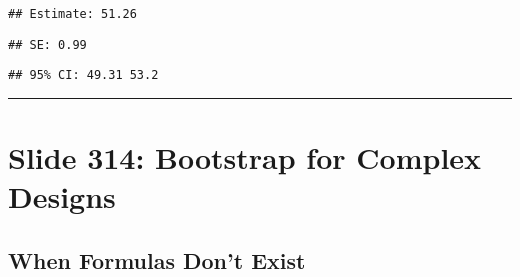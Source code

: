 \documentclass[
]{article}
\newenvironment{Shaded}{\begin{snugshade}}{\end{snugshade}}
\newcommand{\DecValTok}[1]{\textcolor[rgb]{0.00,0.00,0.81}{#1}}
\newcommand{\FunctionTok}[1]{\textcolor[rgb]{0.13,0.29,0.53}{\textbf{#1}}}
\newcommand{\NormalTok}[1]{#1}
\newcommand{\SpecialCharTok}[1]{\textcolor[rgb]{0.81,0.36,0.00}{\textbf{#1}}}
\newcommand{\StringTok}[1]{\textcolor[rgb]{0.31,0.60,0.02}{#1}}
\begin{document}
\begin{verbatim}
## Estimate: 51.26
\end{verbatim}

\begin{Shaded}
\end{Shaded}

\begin{verbatim}
## SE: 0.99
\end{verbatim}

\begin{Shaded}
\end{Shaded}

\begin{verbatim}
## 95% CI: 49.31 53.2
\end{verbatim}

\begin{center}\rule{0.5\linewidth}{0.5pt}\end{center}

\section{Slide 314: Bootstrap for Complex
Designs}\label{slide-314-bootstrap-for-complex-designs}

\subsection{When Formulas Don't Exist}\label{when-formulas-dont-exist}
\end{document}
